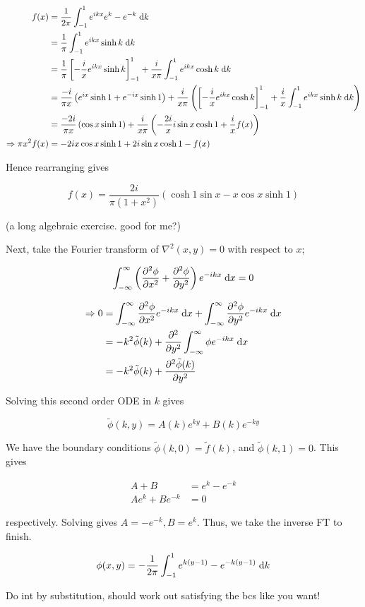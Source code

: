 \documentclass[a4paper]{article}
\begin{document}
\begin{align*}
f(x) & =  \frac{1}{2\pi} \int_{-1}^{1} e^{ikx} e^{k} - e^{-k} \; \mathrm{d} k \\
& = \frac{1}{\pi} \int_{-1}^{1} e^{ikx} \sinh k \; \mathrm{d} k \\
& = \frac{1}{\pi} \left[ - \frac{i}{x} e^{ikx} \sinh k   \right]_{-1}^{1} + \frac{i}{x\pi} \int_{-1}^{1} e^{ikx} \cosh k \; \mathrm{d} k  \\
& = \frac{-i}{\pi x} \left(  e^{ix}\sinh 1 + e^{-ix}\sinh 1   \right) + \frac{i}{x \pi} \left( \left[ - \frac{i}{x} e^{ikx} \cosh k   \right]_{-1}^{1} + \frac{i}{x} \int_{-1}^{1} e^{ikx} \sinh k \; \mathrm{d} k \right)  \\
& =  \frac{-2i}{\pi x} \left( \cos x \sinh 1   \right) + \frac{i}{x \pi} \left( - \frac{2i}{x} i \sin x \cosh 1 + \frac{i}{x} f(x) \right)  \\
\Rightarrow \pi x^{2} f(x) & = -2i x \cos x \sinh 1 + 2 i \sin x \cosh 1 - f(x)
\end{align*}

Hence rearranging gives

\[ f(x) = \frac{2i}{\pi(1+x^{2})} (  \cosh 1 \sin x - x \cos x \sinh 1 ) \]

(a long algebraic exercise. good for me?)

Next, take the Fourier transform of $ \nabla^{2}(x,y) = 0 $ with respect to $ x $;

\[ \int_{-\infty}^{\infty} \left(  \frac{\partial^{2} \phi }{\partial x^{2}} + \frac{\partial^{2} \phi }{\partial y^{2}} \right) e^{-ikx} \; \mathrm{d} x = 0  \]

\begin{align*}
\Rightarrow 0 & = \int_{-\infty}^{\infty}  \frac{\partial^{2} \phi }{\partial x^{2}}  e^{-ikx} \; \mathrm{d} x  + \int_{-\infty}^{\infty} \frac{\partial^{2} \phi }{\partial y^{2}} e^{-ikx} \; \mathrm{d} x\\
& = - k^{2} \tilde{\phi}(k) + \frac{\partial^{2} }{\partial y^{2}} \int_{-\infty}^{\infty}  \phi e^{- i k x} \; \mathrm{d} x\\
& = - k^{2} \tilde{\phi}(k) +  \frac{\partial^{2} \tilde{\phi}(k) }{\partial y^{2}}
\end{align*}

Solving this second order ODE in $ k $ gives

\[ \tilde{\phi}(k,y) = A(k) e^{ky} + B(k) e^{-ky}  \]

We have the boundary conditions $ \tilde{\phi}(k,0) = \tilde{f}(k) $, and $ \tilde{\phi}(k,1) = 0 $. This gives

\begin{align*}
A + B  & = e^{k} - e^{-k} \\
Ae^{k} + Be^{-k}  & = 0 
\end{align*}

respectively. Solving gives $  A = - e^{-k}, B = e^{k} $. Thus, we take the inverse FT to finish.

\begin{align*}
\phi(x,y) &  = - \frac{1}{2\pi}  \int_{-1}^{1} e^{k(y-1)} - e^{-k(y-1)} \; \mathrm{d} k \\
\end{align*}

Do int by substitution, should work out satisfying the bcs like you want!
\end{document}
